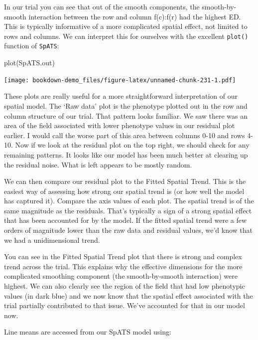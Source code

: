 \documentclass[
]{book}
\newenvironment{Shaded}{\begin{snugshade}}{\end{snugshade}}
\newcommand{\FunctionTok}[1]{\textcolor[rgb]{0.00,0.00,0.00}{#1}}
\newcommand{\NormalTok}[1]{#1}
\begin{document}
In our trial you can see that out of the smooth components, the smooth-by-smooth interaction between the row and column f(c):f(r) had the highest ED. This is typically informative of a more complicated spatial effect, not limited to rows and columns. We can interpret this for ourselves with the excellent \texttt{plot()} function of \texttt{SpATS}:

\begin{Shaded}
\begin{Highlighting}[]
\FunctionTok{plot}\NormalTok{(SpATS.out)}
\end{Highlighting}
\end{Shaded}

\texttt{[image: bookdown-demo\_files/figure-latex/unnamed-chunk-231-1.pdf]}

These plots are really useful for a more straightforward interpretation of our spatial model. The `Raw data' plot is the phenotype plotted out in the row and column structure of our trial. That pattern looks familiar. We saw there was an area of the field associated with lower phenotype values in our residual plot earlier. I would call the worse part of this area between columns 0-10 and rows 4-10. Now if we look at the residual plot on the top right, we should check for any remaining patterns. It looks like our model has been much better at clearing up the residual noise. What is left appears to be mostly random.

We can then compare our residual plot to the Fitted Spatial Trend. This is the easiest way of assessing how strong our spatial trend is (or how well the model has captured it). Compare the axis values of each plot. The spatial trend is of the same magnitude as the residuals. That's typically a sign of a strong spatial effect that has been accounted for by the model. If the fitted spatial trend were a few orders of magnitude lower than the raw data and residual values, we'd know that we had a unidimensional trend.

You can see in the Fitted Spatial Trend plot that there is strong and complex trend across the trial. This explains why the effective dimensions for the more complicated smoothing component (the smooth-by-smooth interaction) were highest. We can also clearly see the region of the field that had low phenotypic values (in dark blue) and we now know that the spatial effect associated with the trial partially contributed to that issue. We've accounted for that in our model now.

Line means are accessed from our SpATS model using:
\end{document}
